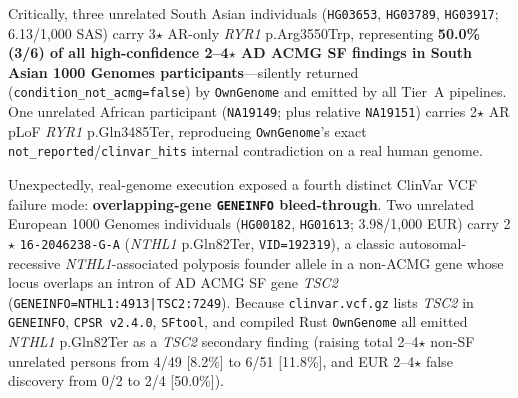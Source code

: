 \documentclass[11pt,letterpaper]{article}
\begin{document}
Critically, three unrelated South Asian individuals (\texttt{HG03653}, \texttt{HG03789}, \texttt{HG03917}; 6.13/1,000 SAS) carry 3$\star$ AR-only \textit{RYR1} p.Arg3550Trp, representing \textbf{50.0\% (3/6) of all high-confidence 2--4$\star$ AD ACMG SF findings in South Asian 1000 Genomes participants}---silently returned (\texttt{condition\_not\_acmg=false}) by \texttt{OwnGenome} and emitted by all Tier~A pipelines. One unrelated African participant (\texttt{NA19149}; plus relative \texttt{NA19151}) carries 2$\star$ AR pLoF \textit{RYR1} p.Gln3485Ter, reproducing \texttt{OwnGenome}'s exact \texttt{not\_reported}/\texttt{clinvar\_hits} internal contradiction on a real human genome.

Unexpectedly, real-genome execution exposed a fourth distinct ClinVar VCF failure mode: \textbf{overlapping-gene \texttt{GENEINFO} bleed-through}. Two unrelated European 1000 Genomes individuals (\texttt{HG00182}, \texttt{HG01613}; 3.98/1,000 EUR) carry 2$\star$ \texttt{16-2046238-G-A} (\textit{NTHL1} p.Gln82Ter, \texttt{VID=192319}), a classic autosomal-recessive \textit{NTHL1}-associated polyposis founder allele in a non-ACMG gene whose locus overlaps an intron of AD ACMG SF gene \textit{TSC2} (\texttt{GENEINFO=NTHL1:4913|TSC2:7249}). Because \texttt{clinvar.vcf.gz} lists \textit{TSC2} in \texttt{GENEINFO}, \texttt{CPSR v2.4.0}, \texttt{SFtool}, and compiled Rust \texttt{OwnGenome} all emitted \textit{NTHL1} p.Gln82Ter as a \textit{TSC2} secondary finding (raising total 2--4$\star$ non-SF unrelated persons from 4/49 [8.2\%] to 6/51 [11.8\%], and EUR 2--4$\star$ false discovery from 0/2 to 2/4 [50.0\%]).
\end{document}
